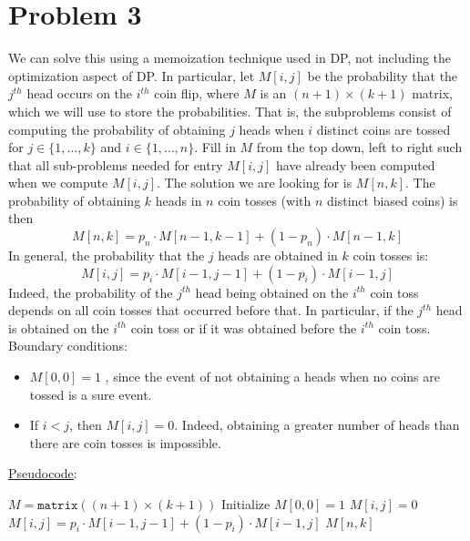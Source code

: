 \documentclass[twoside,11pt]{homework}
\newcommand\NoProc{\renewcommand\algorithmicprocedure{}}
\begin{document}
\section*{Problem 3}
We can solve this using a memoization technique used in DP,  not including the optimization aspect of DP.  In particular, let $M[i,j]$ be the probability that the $j^{th}$ head occurs on the $i^{th}$ coin flip, where $M$ is an $(n+1) \times (k+1) $ matrix, which we will use to store the probabilities.  That is, the subproblems consist of computing the probability of obtaining $j$ heads when $i$ distinct coins are tossed for $j \in \{1, \dots, k\}$ and $i \in \{1, \dots, n\}$.  Fill in $M$ from the top down, left to right such that all sub-problems needed for entry $M[i,j]$ have already been computed when we compute $M[i,j]$.   The solution we are looking for is $M[n,k]$.  The probability of obtaining $k$ heads in $n$ coin tosses (with $n$ distinct biased coins) is then $$M[n, k] = p_n \cdot M[n-1, k-1] + (1-p_n) \cdot M[n-1, k]$$
In general, the probability that the $j$ heads are obtained in $k$ coin tosses is:
$$M[i,j] = p_i \cdot M[i-1, j-1] + (1-p_i) \cdot M[i-1, j]$$
Indeed,  the probability of the $j^{th}$ head being obtained on the $i^{th}$ coin toss depends on all coin tosses that occurred before that.  In particular,  if the $j^{th}$ head is obtained on the $i^{th}$ coin toss or if it was obtained before the $i^{th}$ coin toss.  \\

\noindent
Boundary conditions: 
\begin{itemize}
\item $M[0,0] = 1$ , since the event of not obtaining a heads when no coins are tossed is a sure event.   
\item If $i < j$, then $M[i,j] = 0$. Indeed,  obtaining a greater number of heads than there are coin tosses is impossible.
\end{itemize}

\noindent
\underline{Pseudocode}:
\begin{algorithm}
\begin{algorithmic}[1]
\NoProc
{}
\State $M = \texttt{matrix}((n+1) \times (k+1))$  
\State Initialize $M[0,0] = 1$  
\State $M[i,j] = 0$
\Else
\State $M[i,j] = p_i \cdot M[i-1, j-1] + (1-p_i) \cdot M[i-1, j]$
\EndIf
\EndFor
\EndFor
\State \Return $M[n,k]$
\EndProcedure
\end{algorithmic}
\end{algorithm}
\end{document}
